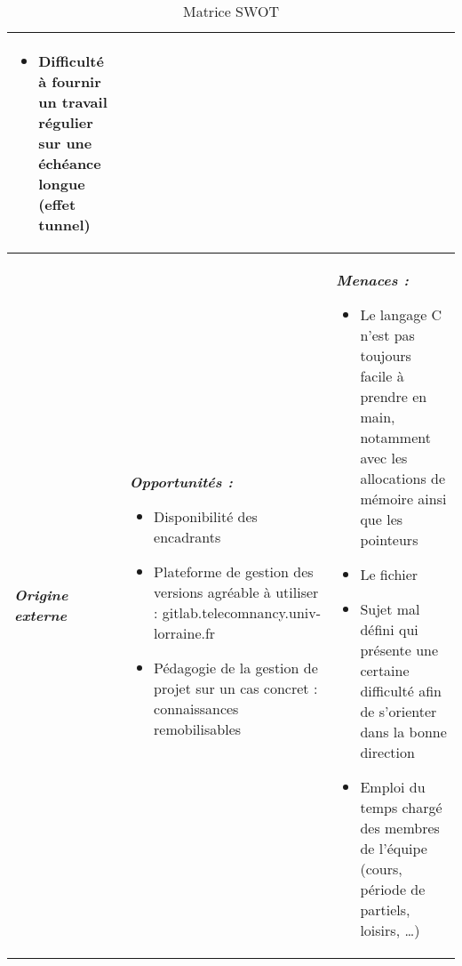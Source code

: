 \documentclass[light]{ceri}
\begin{document}
\begin{table}[h]
\begin{tabular}{|p{1.5cm}|p{7cm}|p{7cm}|}
\begin{itemize}
            \item Difficulté à fournir un travail régulier sur une échéance longue (effet tunnel)
        \end{itemize}
        \tabularnewline \hline
        \cellcolor{blue!30} \textit{\textbf {Origine externe}} & \cellcolor{blue!30} \centering \textit{\textbf {Opportunités :}} 
        \begin{itemize}
            \item Disponibilité des encadrants
            \item Plateforme de gestion des versions agréable à utiliser : gitlab.telecomnancy.univ-lorraine.fr
            \item Pédagogie de la gestion de projet sur un cas concret : connaissances remobilisables
        \end{itemize} & \cellcolor{purple!30} \centering \textit{\textbf {Menaces :}} 
        \begin{itemize}
            \item Le langage C n'est pas toujours facile à prendre en main, notamment avec les allocations de mémoire ainsi que les pointeurs
            \item Le fichier 
            \item Sujet mal défini qui présente une certaine difficulté afin de s'orienter dans la bonne direction
            \item Emploi du temps chargé des membres de l’équipe (cours, période de partiels, loisirs, …)
        \end{itemize}
        \tabularnewline
    \hline
        
    \end{tabular}
    \caption{Matrice SWOT}
    \label{tab:my_label}
\end{table}
\end{document}
